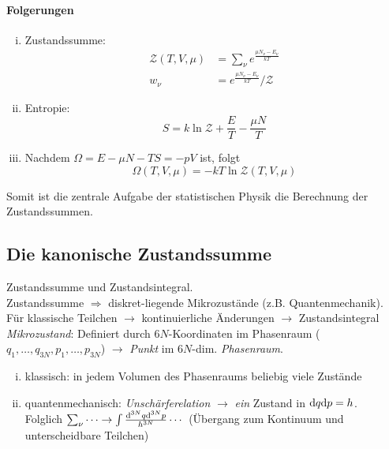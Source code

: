 \paragraph{Folgerungen}
\begin{enumerate}[i)]
    \item Zustandssumme:
    \begin{equation}
        \begin{split}
            \mathcal{Z}(T, V, \mu) &= \sum_\nu e^{\frac{\mu N_\nu - E_\nu}{k T}} \\
            w_\nu &= e^{\frac{\mu N_\nu - E_\nu}{k T}} / \mathcal{Z}
        \end{split}
    \end{equation}
    \item Entropie:
    \begin{equation}
        S = k \ln \mathcal{Z} + \frac{E}{T} - \frac{\mu N}{T}
    \end{equation}
    \item Nachdem $\Omega = E - \mu N - T S = - p V$ ist, folgt
    \begin{equation}
        \Omega(T, V, \mu) = - k T \ln \mathcal{Z}(T, V, \mu)
    \end{equation}
\end{enumerate}
Somit ist die zentrale Aufgabe der statistischen Physik die Berechnung der Zustands\-summen.

\subsection{Die kanonische Zustandssumme}
\label{sub:sum_canon}
Zustandssumme und Zustandsintegral. \\
Zustandssumme $\Rightarrow$ diskret-liegende Mikrozustände (z.B. Quantenmechanik). \\
Für klassische Teilchen $\rightarrow$ kontinuierliche Änderungen $\rightarrow$ Zustandsintegral \\
\emph{Mikrozustand}: Definiert durch $6N$-Koordinaten im Phasenraum ($q_1, \ldots, q_{3N}, p_1, \ldots, p_{3N}$) $\rightarrow$ \emph{Punkt} im
$6N$-dim. \emph{Phasenraum}.
\begin{enumerate}[i)]
    \item klassisch: in jedem Volumen des Phasenraums beliebig viele Zustände
    \item quantenmechanisch: \emph{Unschärferelation} $\rightarrow$ \emph{ein} Zustand in $\mathrm{d} q \mathrm{d} p = h$. \\
    Folglich $\sum_\nu \cdots \rightarrow \int \frac{\mathrm{d}^{3N} q \mathrm{d}^{3N} p}{h^{3N}} \cdots$ (Übergang zum Kontinuum und unterscheidbare Teilchen)
\end{enumerate}
